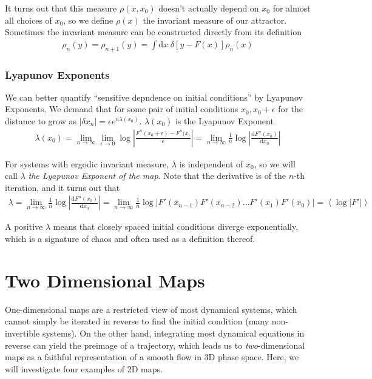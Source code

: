 \documentclass[10pt]{article}
\newcommand{\rd}[2]{\frac{\mathrm{d}#1}{\mathrm{d}#2}}
\newcommand{\abs}[1]{\left|#1\right|}
\newcommand{\expvalue}[1]{\left<#1\right>}
\begin{document}
It turns out that this measure $\rho(x,x_0)$ doesn't actually depend on $x_0$
for almost all choices of $x_0$, so we define $\rho(x)$ the invariant measure of
our attractor. Sometimes the invariant measure can be constructed directly from
its definition
\begin{align}
    \rho_n(y) = \rho_{n+1}(y) = \int \mathrm{d}x\; \delta \left[ y - F(x)
    \right]\rho_n(x)
\end{align}

\subsubsection{Lyapunov Exponents}

We can better quantify ``sensitive depndence on initial conditions'' by Lyapunov
Exponents. We demand that for some pair of initial conditions $x_0, x_0 +
\epsilon$ for the distance to grow as $\abs{\delta x_n} = \epsilon
e^{n\lambda(x_0)}$. $\lambda(x_0)$ is the Lyapunov Exponent
\begin{align}
    \lambda(x_0) = \lim_{n \to \infty}\lim_{\epsilon \to
    0}\log\abs{\frac{F^n(x_0 + \epsilon) - F^n(x_)}{\epsilon}} = \lim_{n \to
    \infty}\frac{1}{n}\log \abs{\rd{F^n(x_0)}{x_0}}
\end{align}

For systems with ergodic invariant measure, $\lambda$ is independent of $x_0$,
so we will call $\lambda$ \emph{the Lyapunov Exponent of the map}. Note that the
derivative is of the $n$-th iteration, and it turns out that
\begin{align}
    \lambda = \lim_{n \to \infty}\frac{1}{n}\log\abs{\rd{F^n(x_0)}{x_0}} =
    \lim_{n \to \infty}\frac{1}{n}\log \abs{F'(x_{n-1})F'(x_{n - 2})\dots
    F'(x_1) F'(x_0)} = \expvalue{\log\abs{F'}}
\end{align}

A positive $\lambda$ means that closely spaced initial conditions diverge
exponentially, which is a signature of chaos and often used as a definition
thereof.

\clearpage

\section{Two Dimensional Maps}

One-dimensional maps are a restricted view of most dynamical systems, which
cannot simply be iterated in reverse to find the initial condition (many
non-invertible systems). On the other hand, integrating most dynamical equations
in reverse can yield the preimage of a trajectory, which leads us to
\emph{two}-dimensional maps as a faithful representation of a smooth flow in 3D
phase space. Here, we will investigate four examples of 2D maps.
\end{document}
